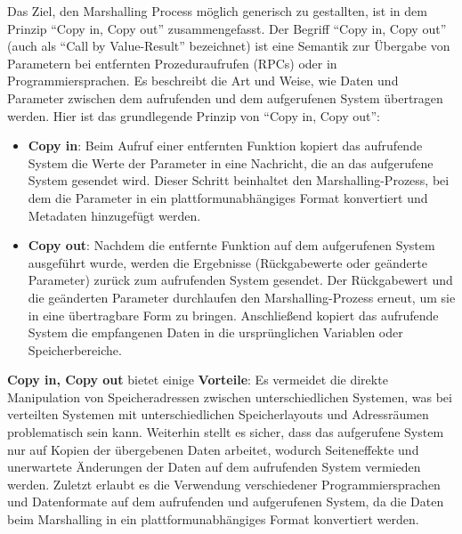 \documentclass[../vs-script-first-v01.tex]{subfiles}
\begin{document}
Das Ziel, den Marshalling Process möglich generisch zu gestallten, ist in dem Prinzip \enquote{Copy in, Copy out} zusammengefasst. Der Begriff \enquote{Copy in, Copy out} (auch als \enquote{Call by Value-Result} bezeichnet) ist eine Semantik zur Übergabe von Parametern bei entfernten Prozeduraufrufen (RPCs) oder in Programmiersprachen. Es beschreibt die Art und Weise, wie Daten und Parameter zwischen dem aufrufenden und dem aufgerufenen System übertragen werden. Hier ist das grundlegende Prinzip von \enquote{Copy in, Copy out}:
\begin{itemize} 
\item \textbf{Copy in}: Beim Aufruf einer entfernten Funktion kopiert das aufrufende System die Werte der Parameter in eine Nachricht, die an das aufgerufene System gesendet wird. Dieser Schritt beinhaltet den Marshalling-Prozess, bei dem die Parameter in ein plattformunabhängiges Format konvertiert und Metadaten hinzugefügt werden.
\item \textbf{Copy out}: Nachdem die entfernte Funktion auf dem aufgerufenen System ausgeführt wurde, werden die Ergebnisse (Rückgabewerte oder geänderte Parameter) zurück zum aufrufenden System gesendet. Der Rückgabewert und die geänderten Parameter durchlaufen den Marshalling-Prozess erneut, um sie in eine übertragbare Form zu bringen. Anschließend kopiert das aufrufende System die empfangenen Daten in die ursprünglichen Variablen oder Speicherbereiche.
\end{itemize} 
\textbf{Copy in, Copy out} bietet einige \textbf{Vorteile}: Es vermeidet die direkte Manipulation von Speicheradressen zwischen unterschiedlichen Systemen, was bei verteilten Systemen mit unterschiedlichen Speicherlayouts und Adressräumen problematisch sein kann. Weiterhin stellt es sicher, dass das aufgerufene System nur auf Kopien der übergebenen Daten arbeitet, wodurch Seiteneffekte und unerwartete Änderungen der Daten auf dem aufrufenden System vermieden werden. Zuletzt erlaubt es die Verwendung verschiedener Programmiersprachen und Datenformate auf dem aufrufenden und aufgerufenen System, da die Daten beim Marshalling in ein plattformunabhängiges Format konvertiert werden.
\end{document}

